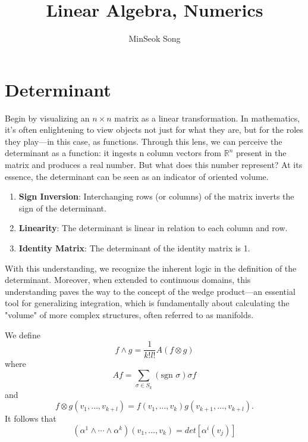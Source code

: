 \documentclass[11pt,reqno]{amsart}
\title{Linear Algebra, Numerics}
\author{MinSeok Song}
\date{}
\theoremstyle{remark}
\begin{document}
\maketitle

\section{Determinant}
Begin by visualizing an $n\times n$ matrix as a linear transformation. In mathematics, it's often enlightening to 
view objects not just for what they are, but for the roles they play—in this case, as functions. Through this lens, we can perceive the determinant as a function: it ingests
n column vectors from $\mathbb{R}^n$ present in the matrix and 
produces a real number. But what does this number represent? At its essence, the determinant 
can be seen as an indicator of oriented volume.
  \begin{enumerate}
  \item \textbf{Sign Inversion}: Interchanging rows (or columns) of the matrix inverts the sign of the determinant.
  \item \textbf{Linearity}: The determinant is linear in relation to each column and row.
  \item \textbf{Identity Matrix}: The determinant of the identity matrix is 1.
  \end{enumerate}

  With this understanding, we recognize the inherent logic in the definition
   of the determinant. Moreover, when extended to continuous domains, this understanding paves the way to the concept of the wedge product—an 
   essential tool for generalizing integration, which is fundamentally about calculating the 
   "volume" of more complex structures, often referred to as manifolds.


We define $$f\wedge g=\frac 1{k!l!}A(f\otimes g)$$ where
$$Af=\sum_{\sigma\in S_k}(\text{sgn } \sigma)\sigma f$$ and $$f\otimes g(v_1,\dots,v_{k+l})=f(v_1,\dots,v_k)g(v_{k+1},\dots,v_{k+l}).$$
  It follows that $$(\alpha^1\wedge\cdots\wedge \alpha^k)(v_1,\dots, v_k)=det[\alpha^i(v_j)]$$
\end{document}
